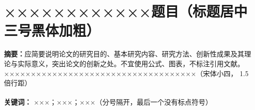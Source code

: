 
\section*{××××××××××××题目（标题居中  三号黑体加粗）}



	\noindent
	\textbf{摘要：}应简要说明论文的研究目的、基本研究内容、研究方法、创新性成果及其理论与实际意义，突出论文的创新之处。不宜使用公式、图表，不标注引用文献。××××××××××××××××××××××××××××××××××××（宋体小四， 1.5倍行距）
	\\
	\\
	\textbf{关键词：} ×××；×××；×××（分号隔开，最后一个没有标点符号）
